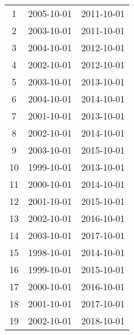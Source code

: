 % 
\begin{tabular}{ccc}
  \hline
  \hline
1 & 2005-10-01 & 2011-10-01 \\ 
  2 & 2003-10-01 & 2011-10-01 \\ 
  3 & 2004-10-01 & 2012-10-01 \\ 
  4 & 2002-10-01 & 2012-10-01 \\ 
  5 & 2003-10-01 & 2013-10-01 \\ 
  6 & 2004-10-01 & 2014-10-01 \\ 
  7 & 2001-10-01 & 2013-10-01 \\ 
  8 & 2002-10-01 & 2014-10-01 \\ 
  9 & 2003-10-01 & 2015-10-01 \\ 
  10 & 1999-10-01 & 2013-10-01 \\ 
  11 & 2000-10-01 & 2014-10-01 \\ 
  12 & 2001-10-01 & 2015-10-01 \\ 
  13 & 2002-10-01 & 2016-10-01 \\ 
  14 & 2003-10-01 & 2017-10-01 \\ 
  15 & 1998-10-01 & 2014-10-01 \\ 
  16 & 1999-10-01 & 2015-10-01 \\ 
  17 & 2000-10-01 & 2016-10-01 \\ 
  18 & 2001-10-01 & 2017-10-01 \\ 
  19 & 2002-10-01 & 2018-10-01 \\ 
   \hline
\end{tabular}
